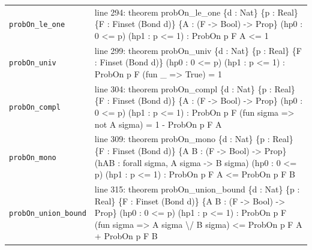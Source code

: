 \documentclass[10pt]{article}
\begin{document}
\begin{longtable}{>{\raggedright\arraybackslash}p{} >{\raggedright\arraybackslash}p{}}
\texttt{probOn\_\allowbreak{}le\_\allowbreak{}one} & {\ttfamily\scriptsize line 294:\allowbreak{} theorem probOn\_\allowbreak{}le\_\allowbreak{}one \{d :\allowbreak{} Nat\} \{p :\allowbreak{} Real\} \{F :\allowbreak{} Finset (\allowbreak{}Bond d)\allowbreak{}\} \{A :\allowbreak{} (\allowbreak{}F -\allowbreak{}> Bool)\allowbreak{} -\allowbreak{}> Prop\} (\allowbreak{}hp0 :\allowbreak{} 0 <=\allowbreak{} p)\allowbreak{} (\allowbreak{}hp1 :\allowbreak{} p <=\allowbreak{} 1)\allowbreak{} :\allowbreak{} ProbOn p F A <=\allowbreak{} 1} \\[0.45em]
\texttt{probOn\_\allowbreak{}univ} & {\ttfamily\scriptsize line 299:\allowbreak{} theorem probOn\_\allowbreak{}univ \{d :\allowbreak{} Nat\} \{p :\allowbreak{} Real\} \{F :\allowbreak{} Finset (\allowbreak{}Bond d)\allowbreak{}\} (\allowbreak{}hp0 :\allowbreak{} 0 <=\allowbreak{} p)\allowbreak{} (\allowbreak{}hp1 :\allowbreak{} p <=\allowbreak{} 1)\allowbreak{} :\allowbreak{} ProbOn p F (\allowbreak{}fun \_\allowbreak{} =\allowbreak{}> True)\allowbreak{} =\allowbreak{} 1} \\[0.45em]
\texttt{probOn\_\allowbreak{}compl} & {\ttfamily\scriptsize line 304:\allowbreak{} theorem probOn\_\allowbreak{}compl \{d :\allowbreak{} Nat\} \{p :\allowbreak{} Real\} \{F :\allowbreak{} Finset (\allowbreak{}Bond d)\allowbreak{}\} \{A :\allowbreak{} (\allowbreak{}F -\allowbreak{}> Bool)\allowbreak{} -\allowbreak{}> Prop\} (\allowbreak{}hp0 :\allowbreak{} 0 <=\allowbreak{} p)\allowbreak{} (\allowbreak{}hp1 :\allowbreak{} p <=\allowbreak{} 1)\allowbreak{} :\allowbreak{} ProbOn p F (\allowbreak{}fun sigma =\allowbreak{}> not A sigma)\allowbreak{} =\allowbreak{} 1 -\allowbreak{} ProbOn p F A} \\[0.45em]
\texttt{probOn\_\allowbreak{}mono} & {\ttfamily\scriptsize line 309:\allowbreak{} theorem probOn\_\allowbreak{}mono \{d :\allowbreak{} Nat\} \{p :\allowbreak{} Real\} \{F :\allowbreak{} Finset (\allowbreak{}Bond d)\allowbreak{}\} \{A B :\allowbreak{} (\allowbreak{}F -\allowbreak{}> Bool)\allowbreak{} -\allowbreak{}> Prop\} (\allowbreak{}hAB :\allowbreak{} forall sigma,\allowbreak{} A sigma -\allowbreak{}> B sigma)\allowbreak{} (\allowbreak{}hp0 :\allowbreak{} 0 <=\allowbreak{} p)\allowbreak{} (\allowbreak{}hp1 :\allowbreak{} p <=\allowbreak{} 1)\allowbreak{} :\allowbreak{} ProbOn p F A <=\allowbreak{} ProbOn p F B} \\[0.45em]
\texttt{probOn\_\allowbreak{}union\_\allowbreak{}bound} & {\ttfamily\scriptsize line 315:\allowbreak{} theorem probOn\_\allowbreak{}union\_\allowbreak{}bound \{d :\allowbreak{} Nat\} \{p :\allowbreak{} Real\} \{F :\allowbreak{} Finset (\allowbreak{}Bond d)\allowbreak{}\} \{A B :\allowbreak{} (\allowbreak{}F -\allowbreak{}> Bool)\allowbreak{} -\allowbreak{}> Prop\} (\allowbreak{}hp0 :\allowbreak{} 0 <=\allowbreak{} p)\allowbreak{} (\allowbreak{}hp1 :\allowbreak{} p <=\allowbreak{} 1)\allowbreak{} :\allowbreak{} ProbOn p F (\allowbreak{}fun sigma =\allowbreak{}> A sigma \textbackslash{}/\allowbreak{} B sigma)\allowbreak{} <=\allowbreak{} ProbOn p F A +\allowbreak{} ProbOn p F B} \\[0.45em]
\end{longtable}
\end{document}
